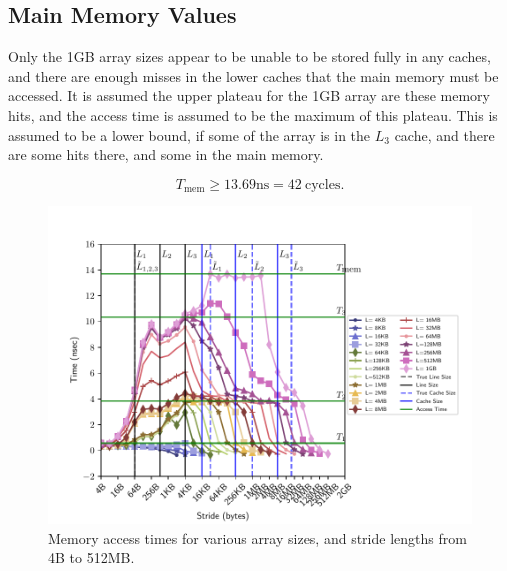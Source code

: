 \documentclass[letterpaper]{article}
\begin{document}
\subsection{Main Memory Values}
Only the 1GB array sizes appear to be unable to be stored fully in any caches, and there are enough misses in the lower caches that the main memory must be accessed. It is assumed the upper plateau for the 1GB array are these memory hits, and the access time is assumed to be the maximum of this plateau. This is assumed to be a lower bound, if some of the array is in the $L_3$ cache, and there are some hits there, and some in the main memory.

$$ T_{\textrm{mem}} \geq 13.69 \textrm{ns} = 42~\textrm{cycles}.$$




\begin{figure}[H]
  \centering
  \includegraphics[width=\textwidth]{figures/membench_all.pdf}
  \caption{Memory access times for various array sizes, and stride lengths from 4B to 512MB.}
  \label{fig:membench_all}
\end{figure}
\end{document}
